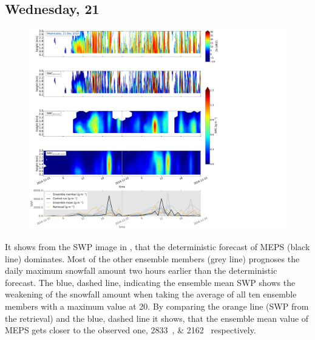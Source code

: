 \subsection{Wednesday, \SI{21}{\dec}}
\label{sec:vertEM09:2112}
\begin{figure}[h]
	\centering
	\includegraphics[trim={0.4cm .4cm 31.3cm 63.5cm},clip,width=\textwidth]{./fig_SWC/20161221}
	\caption{}\label{fig:SWP21}
\end{figure}
It shows from the SWP image in , that the deterministic forecast of MEPS (black line) dominates. Most of the other ensemble members (grey line) prognoses the daily maximum snowfall amount two hours earlier than the deterministic forecast. The blue, dashed line, indicating the ensemble mean SWP shows the weakening of the snowfall amount when taking the average of all ten ensemble members with a maximum value at \SI{20}{\UTC}. By comparing the orange line (SWP from the retrieval) and the blue, dashed line it shows, that the ensemble mean value of MEPS gets closer to the observed one, \SIlist{2833; 2162}{\SWP} respectively.
%
